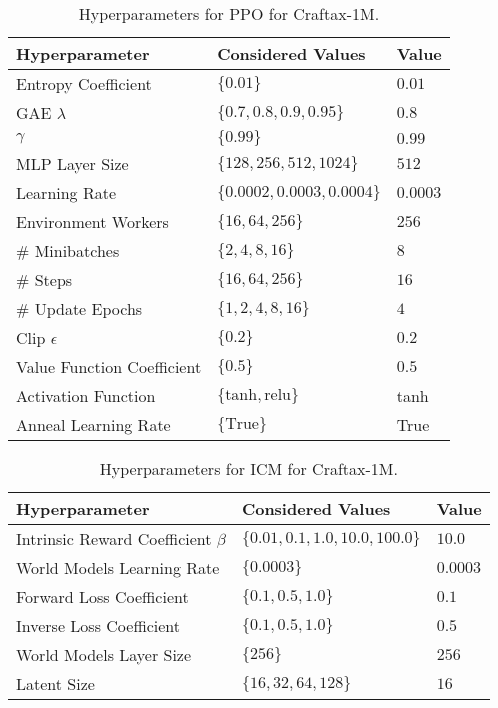 \documentclass{article}
\theoremstyle{plain}
\theoremstyle{definition}
\theoremstyle{remark}
\begin{document}
\begin{table*}[t]
\centering
\begin{tabular}{@{}l l l@{}} 
    \toprule
    \textbf{Hyperparameter} & \textbf{Considered Values} & \textbf{Value} \\
    \midrule
    Entropy Coefficient & $\{0.01\}$ & $0.01$ \\
    GAE $\lambda$ & $\{0.7, 0.8, 0.9, 0.95\}$ & $0.8$ \\
    $\gamma$ & $\{0.99\}$ & $0.99$ \\
    MLP Layer Size & $\{128, 256, 512, 1024\}$ & $512$ \\
    Learning Rate & $\{0.0002, 0.0003, 0.0004\}$ & $0.0003$ \\
    Environment Workers & $\{16, 64, 256\}$ & $256$ \\
    \# Minibatches & $\{2, 4, 8, 16\}$ & $8$ \\
    \# Steps & $\{16, 64, 256\}$ & $16$ \\
    \# Update Epochs & $\{1, 2, 4, 8, 16\}$ & $4$ \\
    Clip $\epsilon$ & $\{0.2\}$ & $0.2$ \\
    Value Function Coefficient & $\{0.5\}$ & $0.5$ \\
    Activation Function & $\{\text{tanh}, \text{relu}\}$ & tanh \\
    Anneal Learning Rate & $\{\text{True}\}$ & True \\
    \bottomrule
\end{tabular}
\caption{Hyperparameters for PPO for Craftax-1M.}
\label{tab:craftax_1m_hyp_ppo}
\end{table*}


\begin{table*}[t]
\centering
\begin{tabular}{@{}l l l@{}} 
    \toprule
    \textbf{Hyperparameter} & \textbf{Considered Values} & \textbf{Value} \\
    \midrule
    Intrinsic Reward Coefficient $\beta$ & $\{0.01, 0.1, 1.0, 10.0, 100.0\}$ & $10.0$ \\
    World Models Learning Rate & $\{0.0003\}$ & $0.0003$ \\
    Forward Loss Coefficient & $\{0.1, 0.5, 1.0\}$ & $0.1$ \\
    Inverse Loss Coefficient & $\{0.1, 0.5, 1.0\}$ & $0.5$ \\
    World Models Layer Size & $\{256\}$ & $256$ \\
    Latent Size & $\{16, 32, 64, 128\}$ & $16$ \\
    \bottomrule
\end{tabular}
\caption{Hyperparameters for ICM for Craftax-1M.}
\label{tab:craftax_1m_hyp_icm}
\end{table*}
\end{document}
